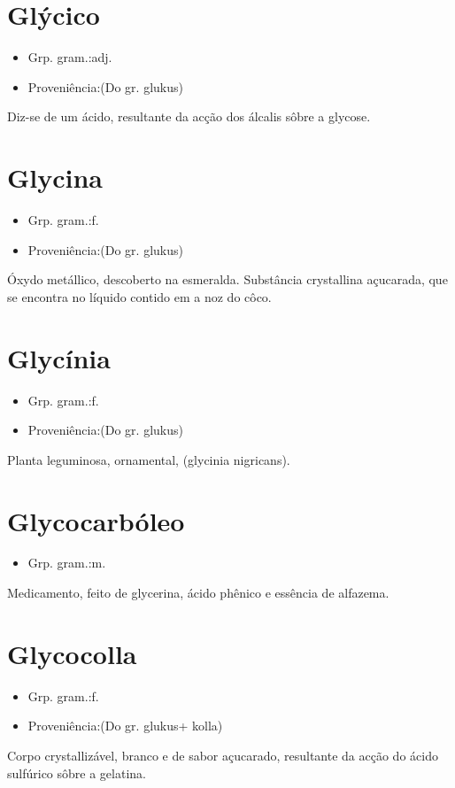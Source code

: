 \section{Glýcico}
\begin{itemize}
\item {Grp. gram.:adj.}
\end{itemize}
\begin{itemize}
\item {Proveniência:(Do gr. \textunderscore glukus\textunderscore )}
\end{itemize}
Diz-se de um ácido, resultante da acção dos álcalis sôbre a glycose.
\section{Glycina}
\begin{itemize}
\item {Grp. gram.:f.}
\end{itemize}
\begin{itemize}
\item {Proveniência:(Do gr. \textunderscore glukus\textunderscore )}
\end{itemize}
Óxydo metállico, descoberto na esmeralda.
Substância crystallina açucarada, que se encontra no líquido contido em a noz do côco.
\section{Glycínia}
\begin{itemize}
\item {Grp. gram.:f.}
\end{itemize}
\begin{itemize}
\item {Proveniência:(Do gr. \textunderscore glukus\textunderscore )}
\end{itemize}
Planta leguminosa, ornamental, (\textunderscore glycinia nigricans\textunderscore ).
\section{Glycocarbóleo}
\begin{itemize}
\item {Grp. gram.:m.}
\end{itemize}
Medicamento, feito de glycerina, ácido phênico e essência de alfazema.
\section{Glycocolla}
\begin{itemize}
\item {Grp. gram.:f.}
\end{itemize}
\begin{itemize}
\item {Proveniência:(Do gr. \textunderscore glukus\textunderscore  + \textunderscore kolla\textunderscore )}
\end{itemize}
Corpo crystallizável, branco e de sabor açucarado, resultante da acção do ácido sulfúrico sôbre a gelatina.
